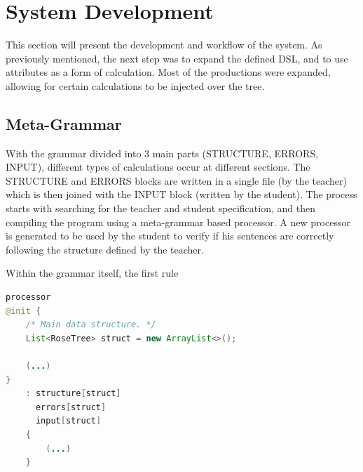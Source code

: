 \chapter{System Development} \label{system_development}

This section will present the development and workflow of the system. 
As previously mentioned, the next step was to expand the defined DSL, and to use attributes as a form of calculation. 
Most of the productions were expanded, allowing for certain calculations to be injected over the tree.

\section{Meta-Grammar}

With the grammar divided into 3 main parts (STRUCTURE, ERRORS, INPUT), different types of calculations occur at different sections. The STRUCTURE and ERRORS blocks are written in a single file (by the teacher) which is then joined 
with the INPUT block (written by the student). The process starts with searching for the teacher and student specification, and then compiling the program using a meta-grammar based processor. A new processor is generated to be 
used by the student to verify if his sentences are correctly following the structure defined by the teacher.

Within the grammar itself, the first rule
\newpage

%

\begin{center}
\begin{minipage}{11cm}
\begin{lstlisting}[language=java, basicstyle=\small, label={lst:processor}, caption=Processor rule from the meta-grammar]
processor
@init {
    /* Main data structure. */
    List<RoseTree> struct = new ArrayList<>();

    (...)
}
    : structure[struct]
      errors[struct]
      input[struct]
    {
        (...)
    }
\end{lstlisting}
\end{minipage}
\end{center}

